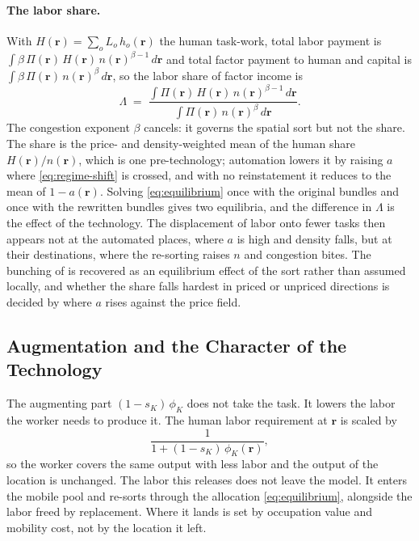\documentclass[12pt, a4paper]{article}
\begin{document}
\paragraph{The labor share.}
With $H(\mathbf{r}) = \sum_o L_o\, h_o(\mathbf{r})$ the human
task-work, total labor payment is
$\int \beta\,\Pi(\mathbf{r})\,H(\mathbf{r})\,n(\mathbf{r})^{\beta-1}\,
d\mathbf{r}$ and total factor payment to human and capital is
$\int \beta\,\Pi(\mathbf{r})\,n(\mathbf{r})^{\beta}\, d\mathbf{r}$, so
the labor share of factor income is
\begin{equation}
  \Lambda
  \;=\;
  \frac{\int \Pi(\mathbf{r})\,H(\mathbf{r})\,
        n(\mathbf{r})^{\beta-1}\, d\mathbf{r}}
       {\int \Pi(\mathbf{r})\, n(\mathbf{r})^{\beta}\, d\mathbf{r}}.
  \label{eq:labor-share-two-factor}
\end{equation}
The congestion exponent $\beta$ cancels: it governs the spatial sort but
not the share. The share is the price- and density-weighted mean of the
human share $H(\mathbf{r})/n(\mathbf{r})$, which is one
pre-technology; automation lowers it by raising $a$ where
\eqref{eq:regime-shift} is crossed, and with no reinstatement it
reduces to the mean of $1 - a(\mathbf{r})$. Solving
\eqref{eq:equilibrium} once with the original bundles and once with the
rewritten bundles gives two equilibria, and the difference in $\Lambda$
is the effect of the technology. The displacement of labor onto fewer
tasks then appears not at the automated places, where $a$ is high and
density falls, but at their destinations, where the re-sorting raises
$n$ and congestion bites. The bunching of \textcite{acemoglu2018race} is
recovered as an equilibrium effect of the sort rather than assumed
locally, and whether the share falls hardest in priced or unpriced
directions is decided by where $a$ rises against the price field.

\subsection{Augmentation and the Character of the Technology}
\label{sec:character}

The augmenting part $(1 - s_K)\,\phi_K$ does not take the task. It lowers
the labor the worker needs to produce it. The human labor requirement at
$\mathbf{r}$ is scaled by
\begin{equation}
  \frac{1}{1 + (1 - s_K)\,\phi_K(\mathbf{r})},
  \label{eq:aug-factor}
\end{equation}
so the worker covers the same output with less labor and the output of
the location is unchanged. The labor this releases does not leave the
model. It enters the mobile pool and re-sorts through the allocation
\eqref{eq:equilibrium}, alongside the labor freed by replacement. Where
it lands is set by occupation value and mobility cost, not by the
location it left.
\end{document}
